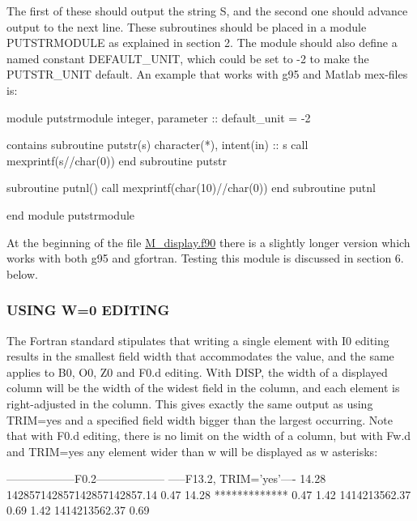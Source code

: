 The first of these should output the string S, and the second one should advance output to the next line. These subroutines should be placed in a module P\+U\+T\+S\+T\+R\+M\+O\+D\+U\+LE as explained in section 2. The module should also define a named constant D\+E\+F\+A\+U\+L\+T\+\_\+\+U\+N\+IT, which could be set to -\/2 to make the P\+U\+T\+S\+T\+R\+\_\+\+U\+N\+IT default. An example that works with g95 and Matlab mex-\/files is\+: \begin{DoxyVerb}  module putstrmodule
    integer, parameter :: default_unit = -2

  contains
    subroutine putstr(s)
      character(*), intent(in) :: s
      call mexprintf(s//char(0))
    end subroutine putstr

    subroutine putnl()
      call mexprintf(char(10)//char(0))
    end subroutine putnl

  end module putstrmodule
\end{DoxyVerb}


At the beginning of the file \hyperlink{M__display_8f90}{M\+\_\+display.\+f90} there is a slightly longer version which works with both g95 and gfortran. Testing this module is discussed in section 6. below.

\subsubsection*{U\+S\+I\+NG W=0 E\+D\+I\+T\+I\+NG}

The Fortran standard stipulates that writing a single element with I0 editing results in the smallest field width that accommodates the value, and the same applies to B0, O0, Z0 and F0.\+d editing. With D\+I\+SP, the width of a displayed column will be the width of the widest field in the column, and each element is right-\/adjusted in the column. This gives exactly the same output as using T\+R\+IM=\textquotesingle{}yes\textquotesingle{} and a specified field width bigger than the largest occurring. Note that with F0.\+d editing, there is no limit on the width of a column, but with Fw.\+d and T\+R\+IM=\textquotesingle{}yes\textquotesingle{} any element wider than w will be displayed as w asterisks\+: \begin{DoxyVerb}  ------------------F0.2------------------    -----F13.2, TRIM='yes'----
  14.28  142857142857142857142857.14  0.47    14.28  *************  0.47
   1.42                1414213562.37  0.69     1.42  1414213562.37  0.69
\end{DoxyVerb}


